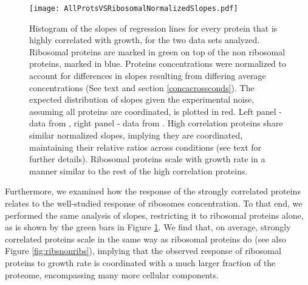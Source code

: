 \documentclass[notitlepage]{article}
\begin{document}
\begin{figure}[h]
\centering
\texttt{[image: AllProtsVSRibosomalNormalizedSlopes.pdf]}
\caption{
    Histogram of the slopes of regression lines for every protein that is highly correlated with growth, for the two data sets analyzed.
    Ribosomal proteins are marked in green on top of the non ribosomal proteins, marked in blue.
    Proteins concentrations were normalized to account for differences in slopes resulting from differing average concentrations (See text and section \ref{concacrossconds}).
    The expected distribution of slopes given the experimental noise, assuming all proteins are coordinated, is plotted in red.
    Left panel - data from \cite{Valgepea2013}, right panel - data from \cite{Heinemann2014}.
    High correlation proteins share similar normalized slopes, implying they are coordinated, maintaining their relative ratios across conditions (see text for further details).
    Ribosomal proteins scale with growth rate in a manner similar to the rest of the high correlation proteins.
}
\label{fig:globalfit}
\end{figure}

Furthermore, we examined how the response of the strongly correlated proteins relates to the well-studied response of ribosomes concentration.
To that end, we performed the same analysis of slopes, restricting it to ribosomal proteins alone, as is shown by the green bars in Figure \ref{fig:globalfit}.
We find that, on average, strongly correlated proteins scale in the same way as ribosomal proteins do (see also Figure \ref{fig:ribsnonribs}), implying that the observed response of ribosomal proteins to growth rate is coordinated with a much larger fraction of the proteome, encompassing many more cellular components.
\end{document}
